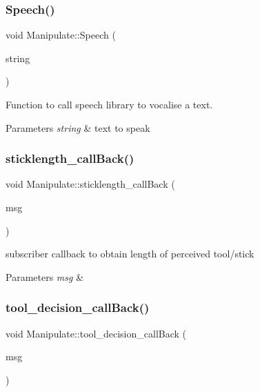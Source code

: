 \subsubsection{\texorpdfstring{Speech()}{Speech()}}
{\footnotesize\ttfamily void Manipulate\+::\+Speech (\begin{DoxyParamCaption}\item[{std\+::string}]{string }\end{DoxyParamCaption})\hspace{0.3cm}{\ttfamily [private]}}



Function to call speech library to vocalise a text. 


\begin{DoxyParams}{Parameters}
{\em string} & text to speak \\
\hline
\end{DoxyParams}
\mbox{\label{structManipulate_a4613e373fc630c6f172f8c62b0bbf6a2}} 
\subsubsection{\texorpdfstring{sticklength\+\_\+call\+Back()}{sticklength\_callBack()}}
{\footnotesize\ttfamily void Manipulate\+::sticklength\+\_\+call\+Back (\begin{DoxyParamCaption}\item[{const std\+\_\+msgs\+::\+Float64\+::\+Ptr \&}]{msg }\end{DoxyParamCaption})\hspace{0.3cm}{\ttfamily [private]}}



subscriber callback to obtain length of perceived tool/stick 


\begin{DoxyParams}{Parameters}
{\em msg} & \\
\hline
\end{DoxyParams}
\mbox{\label{structManipulate_a749da7d9cfed1b07a3aeb9f42e2258e8}} 
\subsubsection{\texorpdfstring{tool\+\_\+decision\+\_\+call\+Back()}{tool\_decision\_callBack()}}
{\footnotesize\ttfamily void Manipulate\+::tool\+\_\+decision\+\_\+call\+Back (\begin{DoxyParamCaption}\item[{const std\+\_\+msgs\+::\+Int32\+::\+Ptr \&}]{msg }\end{DoxyParamCaption})\hspace{0.3cm}{\ttfamily [private]}}



